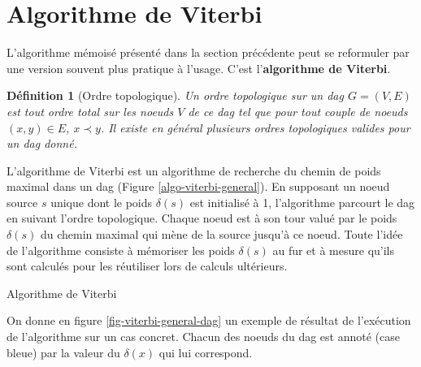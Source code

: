 \documentclass[11pt,openany]{book}
\newtheorem{definition}{Définition}[chapter]
\newcommand{\ac}[1]{{\sc #1}} %
\newcommand{\kw}[1]{{\bf #1}} %
\begin{document}
\section{Algorithme de Viterbi}
L'algorithme mémoisé présenté dans la section précédente peut se reformuler par une version souvent plus pratique à l'usage. C'est l'\kw{algorithme de Viterbi}.

\begin{definition}[Ordre topologique] Un ordre topologique sur un \ac{dag} $G=(V,E)$ est tout ordre total sur les noeuds $V$ de ce \ac{dag} tel que pour tout couple de noeuds $(x,y) \in E$,  $x \prec y$. Il existe en général plusieurs ordres topologiques valides pour un \ac{dag} donné.
\end{definition}

L'algorithme de Viterbi est un algorithme de recherche du chemin de
poids maximal dans un \ac{dag} (Figure \ref{algo-viterbi-general}). 
 En supposant un noeud source $s$ unique dont le poids $\delta(s)$ est
 initialisé à 1, l'algorithme parcourt le \ac{dag} en suivant l'ordre
 topologique. Chaque noeud est à son tour valué par le poids
 $\delta(s)$ du chemin maximal qui mène de la source jusqu'à ce
 noeud. Toute l'idée de l'algorithme consiste à mémoriser les poids
 $\delta(s)$ au fur et à mesure qu'ils sont calculés pour les
 réutiliser lors de calculs ultérieurs.

\begin{algorithm}[htbp]
\caption{\label{algo-viterbi-general}Algorithme de Viterbi}
\end{algorithm}

On donne en figure \ref{fig-viterbi-general-dag} un exemple de
résultat de l'exécution de l'algorithme sur un cas concret. Chacun des
noeuds du \ac{dag} est annoté (case bleue) par la valeur du $\delta(x)$
qui lui correspond.
\end{document}
